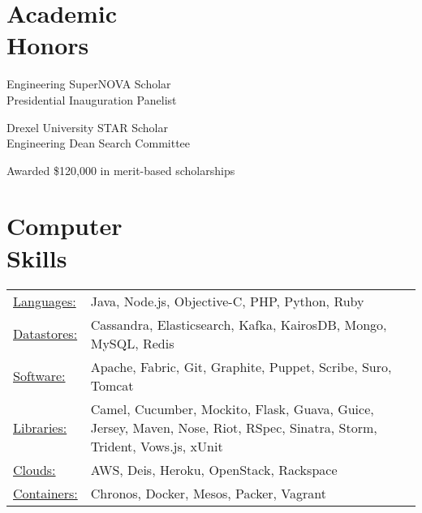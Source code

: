\documentclass[margin]{res}
\begin{document}
\begin{resume}
\section{Academic \\ Honors}
\begin{minipage}[t]{0.5\linewidth}
Engineering SuperNOVA Scholar \\
Presidential Inauguration Panelist \\
\end{minipage}
\begin{minipage}[t]{0.5\linewidth}
Drexel University STAR Scholar \\
Engineering Dean Search Committee \\ 
\end{minipage}

\vspace{-5mm}
{\centering Awarded \$120,000 in merit-based scholarships

}

\section{Computer \\ Skills}
   \begin{tabular}{l p{3in}}
    \underline{Languages:} & %
    Java, Node.js, Objective-C, PHP, Python, Ruby \\
    \underline{Datastores:} & Cassandra, Elasticsearch, Kafka, KairosDB, Mongo, MySQL, 
    Redis \\
     \underline{Software:} & Apache,
Fabric, 
Git,
Graphite, 
     Puppet, 
     Scribe,
     Suro,
     Tomcat \\
     \underline{Libraries:} & Camel, Cucumber,
     Mockito, Flask, Guava, Guice,
     Jersey, Maven, Nose,
     Riot, RSpec, 
       Sinatra, Storm, Trident, Vows.js, xUnit \\
\underline{Clouds:} & AWS, Deis, Heroku, OpenStack, Rackspace \\
\underline{Containers:} & Chronos, Docker, Mesos, Packer, Vagrant 
\end{tabular}


\end{resume}
\end{document}
